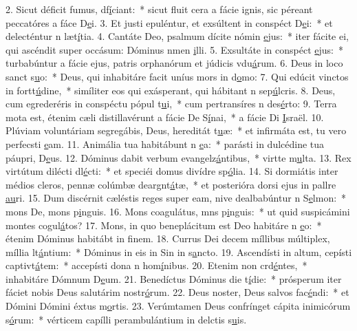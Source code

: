 2. Sicut déficit fumus, df\uline{í}ciant:~* sicut fluit cera a fácie ignis, sic péreant peccatóres a fáce D\uline{e}i.
3. Et justi epuléntur, et exsúltent in conspéct D\uline{e}i:~* et delecténtur n læt\uline{í}tia.
4. Cantáte Deo, psalmum dícite nómin \uline{e}jus:~* iter fácite ei, qui ascéndit super occásum: Dóminus nmen \uline{i}lli.
5. Exsultáte in conspéct \uline{e}jus:~* turbabúntur a fácie ejus, patris orphanórum et júdicis vdu\uline{á}rum.
6. Deus in loco sanct s\uline{u}o:~* Deus, qui inhabitáre facit uníus mors in d\uline{o}mo:
7. Qui edúcit vinctos in fortt\uline{ú}dine,~* simíliter eos qui exásperant, qui hábitant n sep\uline{ú}lcris.
8. Deus, cum egrederéris in conspéctu pópul t\uline{u}i,~* cum pertransíres n des\uline{é}rto:
9. Terra mota est, étenim cæli distillavérunt a fácie De S\uline{í}nai,~* a fácie Di \uline{I}sraël.
10. Plúviam voluntáriam segregábis, Deus, hereditát t\uline{u}æ:~* et infirmáta est, tu vero perfecsti \uline{e}am.
11. Animália tua habitábunt n \uline{e}a:~* parásti in dulcédine tua páupri, D\uline{e}us.
12. Dóminus dabit verbum evangelz\uline{á}ntibus,~* virtte m\uline{u}lta.
13. Rex virtútum dilécti dl\uline{é}cti:~* et speciéi domus divídre sp\uline{ó}lia.
14. Si dormiátis inter médios cleros, pennæ colúmbæ deargnt\uline{á}tæ,~* et posterióra dorsi ejus in pallre \uline{au}ri.
15. Dum discérnit cæléstis reges super eam, nive dealbabúntur n S\uline{e}lmon:~* mons De, mons p\uline{i}nguis.
16. Mons coagulátus, mns p\uline{i}nguis:~* ut quid suspicámini montes cogul\uline{á}tos?
17. Mons, in quo beneplácitum est Deo habitáre n \uline{e}o:~* étenim Dóminus habitábt in f\uline{i}nem.
18. Currus Dei decem míllibus múltiplex, míllia lt\uline{á}ntium:~* Dóminus in eis in Sin in s\uline{a}ncto.
19. Ascendísti in altum, cepísti captivt\uline{á}tem:~* accepísti dona n hom\uline{í}nibus.
20. Etenim non crd\uline{é}ntes,~* inhabitáre Dómnum D\uline{e}um.
21. Benedíctus Dóminus die t\uline{í}die:~* prósperum iter fáciet nobis Deus salutárim nostr\uline{ó}rum.
22. Deus noster, Deus salvos fac\uline{é}ndi:~* et Dómini Dómini éxtus m\uline{o}rtis.
23. Verúmtamen Deus confrínget cápita inimicórum s\uline{ó}rum:~* vérticem capílli perambulántium in delctis s\uline{u}is.
